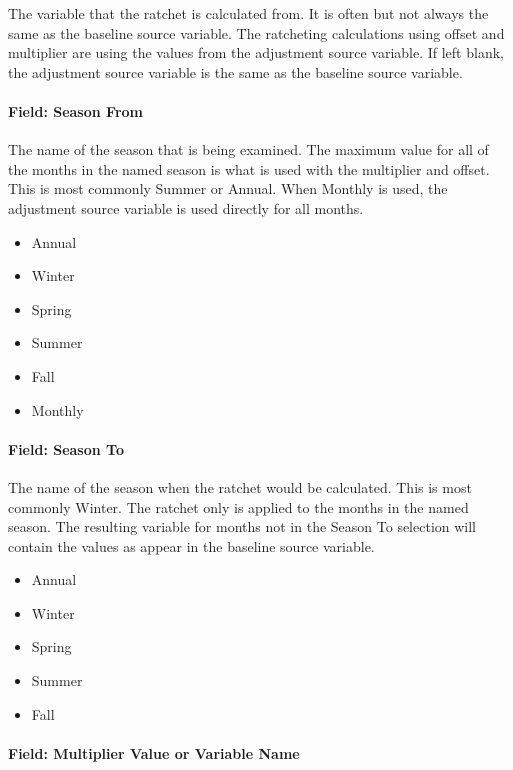 The variable that the ratchet is calculated from. It is often but not always the same as the baseline source variable. The ratcheting calculations using offset and multiplier are using the values from the adjustment source variable. If left blank, the adjustment source variable is the same as the baseline source variable.

\paragraph{Field: Season From}\label{field-season-from}

The name of the season that is being examined. The maximum value for all of the months in the named season is what is used with the multiplier and offset. This is most commonly Summer or Annual. When Monthly is used, the adjustment source variable is used directly for all months.

\begin{itemize}
\item
  Annual
\item
  Winter
\item
  Spring
\item
  Summer
\item
  Fall
\item
  Monthly
\end{itemize}

\paragraph{Field: Season To}\label{field-season-to}

The name of the season when the ratchet would be calculated. This is most commonly Winter. The ratchet only is applied to the months in the named season. The resulting variable for months not in the Season To selection will contain the values as appear in the baseline source variable.

\begin{itemize}
\item
  Annual
\item
  Winter
\item
  Spring
\item
  Summer
\item
  Fall
\end{itemize}

\paragraph{Field: Multiplier Value or Variable Name}\label{field-multiplier-value-or-variable-name}

